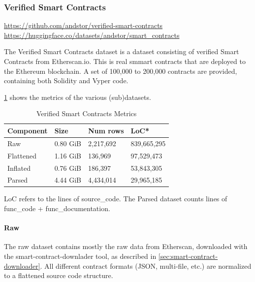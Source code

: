 \subsubsection{Verified Smart Contracts}
\label{sec:verified-smart-contracts}
\url{https://github.com/andstor/verified-smart-contracts}
\url{https://huggingface.co/datasets/andstor/smart_contracts}

The Verified Smart Contracts dataset is a dataset consisting of verified Smart Contracts from Etherscan.io. This is real smmart contracts that are deployed to the Ethereum blockchain. A set of 100,000 to 200,000 contracts are provided, containing both Solidity and Vyper code.

\cref{tab:verified-smart-contracts-metrics} shows the metrics of the various (sub)datasets.

\begin{table}
    \def\arraystretch{1.5}
    \small
    \centering
    \caption{Verified Smart Contracts Metrics}
    \label{tab:verified-smart-contracts-metrics}
    \begin{tabularx}{\textwidth}{XXXX}
        \toprule
        \textbf{Component} & \textbf{Size} &  \textbf{Num rows} & \textbf{LoC*}\\
        \midrule
        Raw & 0.80 GiB & 2,217,692 & 839,665,295\\
        Flattened & 1.16 GiB & 136,969 & 97,529,473\\
        Inflated & 0.76 GiB & 186,397 & 53,843,305\\
        Parsed & 4.44 GiB & 4,434,014 & 29,965,185\\
        \bottomrule
    \end{tabularx}
\end{table}

LoC refers to the lines of source\_code. The Parsed dataset counts lines of func\_code + func\_documentation.

\paragraph{Raw}
\label{sec:verified-smart-contracts-raw}
The raw dataset contains mostly the raw data from Etherscan, downloaded with the smart-contract-downlader tool, as described in \cref{sec:smart-contract-downloader}. All different contract formats (JSON, multi-file, etc.) are normalized to a flattened source code structure. 


